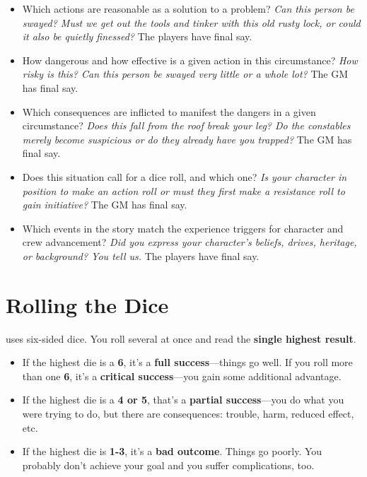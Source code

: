 \documentclass[11pt,fleqn,a5paper]{book}
\begin{document}
\begin{itemize}
	\item Which actions are reasonable as a solution to a problem? \emph{Can this person be swayed? Must we get out the tools and tinker with this old rusty lock, or could it also be quietly finessed?} The players have final say.
	\item How dangerous and how effective is a given action in this circumstance? \emph{How risky is this? Can this person be swayed very little or a whole lot?} The GM has final say.
	\item Which consequences are inflicted to manifest the dangers in a given circumstance? \emph{Does this fall from the roof break your leg? Do the constables merely become suspicious or do they already have you trapped?} The GM has final say.
	\item Does this situation call for a dice roll, and which one? \emph{Is your character in position to make an action roll or must they first make a resistance roll to gain initiative?} The GM has final say.
	\item Which events in the story match the experience triggers for character and crew advancement? \emph{Did you express your character’s beliefs, drives, heritage, or background? You tell us.} The players have final say.
\end{itemize}

\section{Rolling the Dice}

\thetitle{} uses six-sided dice. You roll several at once and read the \textbf{single highest result}.

\begin{itemize}
	\item If the highest die is a \textbf{6}, it’s a \textbf{full success}---things go well. If you roll more than one \textbf{6}, it’s a \textbf{critical success}---you gain some additional advantage.
	\item If the highest die is a \textbf{4 or 5}, that’s a \textbf{partial success}---you do what you were trying to do, but there are consequences: trouble, harm, reduced effect, etc.
	\item If the highest die is \textbf{1-3}, it’s a \textbf{bad outcome}. Things go poorly. You probably don’t achieve your goal and you suffer complications, too.
\end{itemize}
\end{document}
